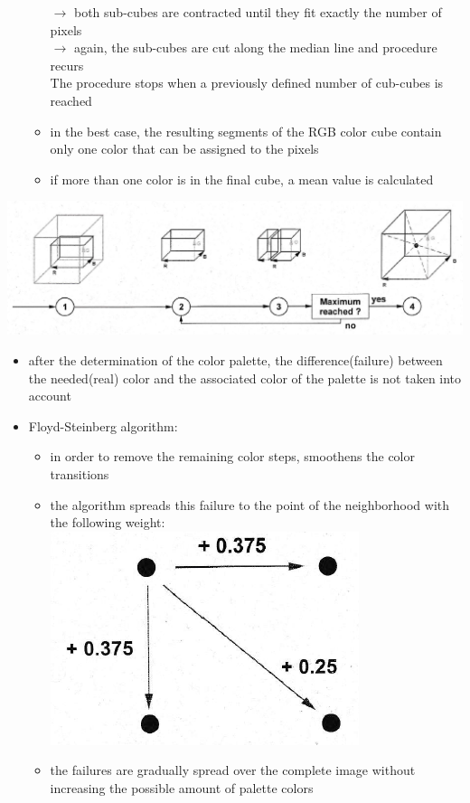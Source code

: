 \documentclass[12pt]{article}
\begin{document}
\begin{itemize}
\begin{itemize}
		$\rightarrow$  both sub-cubes are contracted until they fit exactly the number of pixels \\
		$\rightarrow$ again, the sub-cubes are cut along the median line and procedure recurs \\
		The procedure stops when a previously defined number of cub-cubes is reached
		\item in the best case, the resulting segments of the RGB color cube contain only one color that can be assigned to the pixels
		\item if more than one color is in the final cube, a mean value is calculated
	\end{itemize}
\end{itemize}

\includegraphics[scale=0.5]{3_69}

\begin{itemize}
	\item after the determination of the color palette, the difference(failure) between the needed(real) color and the associated color of the palette is not taken into account
	\item Floyd-Steinberg algorithm:
	\begin{itemize}
		\item in order to remove the remaining color steps, smoothens the color transitions
		\item the algorithm spreads this failure to the point of the neighborhood with the following weight: \\
		\includegraphics[scale=0.5]{3_71}
		\item the failures are gradually spread over the complete image without increasing the possible amount of palette colors
	\end{itemize}
\end{itemize}
\end{document}
